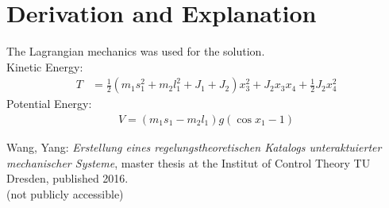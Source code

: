 \documentclass[10pt,a4paper]{article}
\begin{document}
	
	\section{Derivation and Explanation} %
	The Lagrangian mechanics was used for the solution. \\
	Kinetic Energy: 
	\begin{align}
		T &= \frac{1}{2}(m_1s_1^2 + m_2l_1^2 + J_1 + J_2)x_3^2 + J_2x_3x_4 + \frac{1}{2}J_2x_4^2
	\end{align}
	Potential Energy: 
	\begin{align}
		V = (m_1s_1 - m_2l_1)g(\cos x_1 -1)
	\end{align}
	
	
	\begin{thebibliography}{10}		
		Wang, Yang:  
		\textit{Erstellung eines regelungstheoretischen Katalogs unteraktuierter mechanischer Systeme}, master thesis at the Institut of Control Theory TU Dresden, published 2016. \\
		(not publicly accessible)
	\end{thebibliography}
\end{document}
